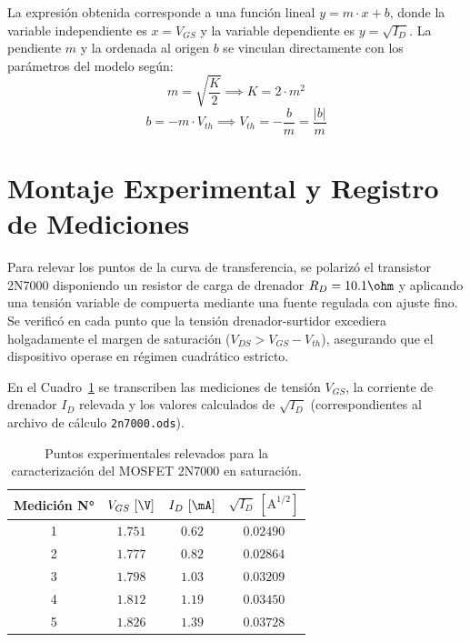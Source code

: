 La expresión obtenida corresponde a una función lineal $y = m \cdot x + b$, donde la variable independiente es
$x = V_{GS}$ y la variable dependiente es $y = \sqrt{I_D}$. La pendiente $m$ y la ordenada al origen $b$ se vinculan
directamente con los parámetros del modelo según:
\begin{equation}
  m = \sqrt{\frac{K}{2}} \implies K = 2 \cdot m^2
  \label{eq:parametro_K}
\end{equation}
\begin{equation}
  b = -m \cdot V_{th} \implies V_{th} = -\frac{b}{m} = \frac{|b|}{m}
  \label{eq:parametro_Vth}
\end{equation}

\section{Montaje Experimental y Registro de Mediciones}

Para relevar los puntos de la curva de transferencia, se polarizó el transistor 2N7000 disponiendo un resistor de carga
de drenador $R_D = 10.1\ohm$ y aplicando una tensión variable de compuerta mediante una fuente regulada con ajuste fino.
Se verificó en cada punto que la tensión drenador-surtidor excediera holgadamente el margen de saturación
($V_{DS} > V_{GS} - V_{th}$), asegurando que el dispositivo operase en régimen cuadrático estricto.

En el Cuadro~\ref{tab:mediciones_2n7000} se transcriben las mediciones de tensión $V_{GS}$, la corriente de drenador
$I_D$ relevada y los valores calculados de $\sqrt{I_D}$ (correspondientes al archivo de cálculo \texttt{2n7000.ods}).

\begin{table}[!ht]
  \centering
  \begin{tabular}{|c|c|c|c|}
    \hline
    \textbf{Medición N°} & $V_{GS}\ [\V]$ & $I_D\ [\mA]$ & $\sqrt{I_D}\ [\mathrm{A}^{1/2}]$ \\
    \hline
    1 & $1.751$ & $0.62$ & $0.02490$ \\
    2 & $1.777$ & $0.82$ & $0.02864$ \\
    3 & $1.798$ & $1.03$ & $0.03209$ \\
    4 & $1.812$ & $1.19$ & $0.03450$ \\
    5 & $1.826$ & $1.39$ & $0.03728$ \\
    \hline
  \end{tabular}
  \caption{Puntos experimentales relevados para la caracterización del MOSFET 2N7000 en saturación.}
  \label{tab:mediciones_2n7000}
\end{table}

